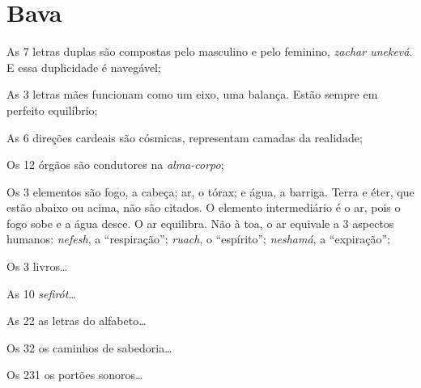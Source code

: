 \chapter*{Bava \smallskip{}}

\begin{center}
{\huge{}}
\end{center}

\noindent{}As 7 letras duplas são compostas pelo masculino e pelo feminino, \textit{zachar unekevá}. E essa duplicidade é navegável;

\smallskip
\noindent{}As 3 letras mães funcionam como um eixo, uma balança. Estão sempre em perfeito equilíbrio;

\smallskip
\noindent{}As 6 direções cardeais são cósmicas, representam camadas da realidade;

\smallskip
\noindent{}Os 12 órgãos são condutores na \textit{alma-corpo};

\smallskip
\noindent{}Os 3 elementos são fogo, a cabeça; ar, o tórax; e água, a barriga. Terra e éter, que estão abaixo ou acima, não são citados. O elemento intermediário é o ar, pois o fogo sobe e a água desce. O ar equilibra. Não à toa, o ar equivale a 3 aspectos humanos: \textit{nefesh}, a ``respiração''; \textit{ruach}, o ``espírito''; \textit{neshamá}, a ``expiração'';

\smallskip
\noindent{}Os 3 livros\ldots{}

\smallskip
\noindent{}As 10 \textit{sefirót}\ldots{}

\smallskip
\noindent{}As 22 as letras do alfabeto\ldots{}

\smallskip
\noindent{}Os 32 os caminhos de sabedoria\ldots{}

\smallskip
\noindent{}Os 231 os portões sonoros\ldots{}



